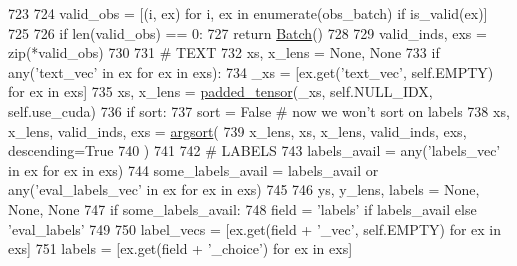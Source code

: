 \begin{DoxyCode}
723 
724         valid\_obs = [(i, ex) \textcolor{keywordflow}{for} i, ex \textcolor{keywordflow}{in} enumerate(obs\_batch) \textcolor{keywordflow}{if} is\_valid(ex)]
725 
726         \textcolor{keywordflow}{if} len(valid\_obs) == 0:
727             \textcolor{keywordflow}{return} \hyperlink{namespaceparlai_1_1agents_1_1legacy__agents_1_1seq2seq_1_1torch__agent__v1_a74cfde390a2b9861179ac0fcd59da28c}{Batch}()
728 
729         valid\_inds, exs = zip(*valid\_obs)
730 
731         \textcolor{comment}{# TEXT}
732         xs, x\_lens = \textcolor{keywordtype}{None}, \textcolor{keywordtype}{None}
733         \textcolor{keywordflow}{if} any(\textcolor{stringliteral}{'text\_vec'} \textcolor{keywordflow}{in} ex \textcolor{keywordflow}{for} ex \textcolor{keywordflow}{in} exs):
734             \_xs = [ex.get(\textcolor{stringliteral}{'text\_vec'}, self.EMPTY) \textcolor{keywordflow}{for} ex \textcolor{keywordflow}{in} exs]
735             xs, x\_lens = \hyperlink{namespaceparlai_1_1agents_1_1legacy__agents_1_1seq2seq_1_1utils__v1_adb5a414ae439f14c54e8c760b91cc4c8}{padded\_tensor}(\_xs, self.NULL\_IDX, self.use\_cuda)
736             \textcolor{keywordflow}{if} sort:
737                 sort = \textcolor{keyword}{False}  \textcolor{comment}{# now we won't sort on labels}
738                 xs, x\_lens, valid\_inds, exs = \hyperlink{namespaceparlai_1_1agents_1_1legacy__agents_1_1seq2seq_1_1utils__v1_a1521e559b740f741ebb47b8755202bb2}{argsort}(
739                     x\_lens, xs, x\_lens, valid\_inds, exs, descending=\textcolor{keyword}{True}
740                 )
741 
742         \textcolor{comment}{# LABELS}
743         labels\_avail = any(\textcolor{stringliteral}{'labels\_vec'} \textcolor{keywordflow}{in} ex \textcolor{keywordflow}{for} ex \textcolor{keywordflow}{in} exs)
744         some\_labels\_avail = labels\_avail \textcolor{keywordflow}{or} any(\textcolor{stringliteral}{'eval\_labels\_vec'} \textcolor{keywordflow}{in} ex \textcolor{keywordflow}{for} ex \textcolor{keywordflow}{in} exs)
745 
746         ys, y\_lens, labels = \textcolor{keywordtype}{None}, \textcolor{keywordtype}{None}, \textcolor{keywordtype}{None}
747         \textcolor{keywordflow}{if} some\_labels\_avail:
748             field = \textcolor{stringliteral}{'labels'} \textcolor{keywordflow}{if} labels\_avail \textcolor{keywordflow}{else} \textcolor{stringliteral}{'eval\_labels'}
749 
750             label\_vecs = [ex.get(field + \textcolor{stringliteral}{'\_vec'}, self.EMPTY) \textcolor{keywordflow}{for} ex \textcolor{keywordflow}{in} exs]
751             labels = [ex.get(field + \textcolor{stringliteral}{'\_choice'}) \textcolor{keywordflow}{for} ex \textcolor{keywordflow}{in} exs]

\end{DoxyCode}
